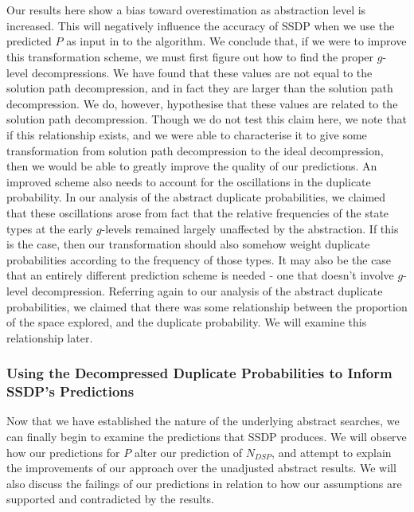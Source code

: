 \documentclass{article}
\begin{document}
Our results here show a bias toward overestimation
as abstraction level is increased.
This will negatively influence the accuracy of SSDP when we use the predicted \(\hat{P}\)
as input in to the algorithm.
We conclude that, if we were to improve this transformation scheme,
we must first figure out how to find the proper \(g\)-level decompressions.
We have found that these values are not equal to the solution path decompression,
and in fact they are larger than the solution path decompression.
We do, however, hypothesise that these values are related to the solution path decompression.
Though we do not test this claim here, we note that if this relationship exists,
and we were able to characterise it to give some transformation from solution path decompression
to the ideal decompression,
then we would be able to greatly improve the quality of our predictions.
An improved scheme also needs to account for the oscillations in the duplicate probability.
In our analysis of the abstract duplicate probabilities, we claimed that these oscillations
arose from fact that the relative frequencies of the state types at the early \(g\)-levels
remained largely unaffected by the abstraction. If this is the case,
then our transformation should also somehow weight duplicate probabilities according
to the frequency of those types.
It may also be the case that an entirely different prediction scheme is needed -
one that doesn't involve \(g\)-level decompression.
Referring again to our analysis of the abstract duplicate probabilities,
we claimed that there was some relationship between the proportion of the space
explored, and the duplicate probability.
We will examine this relationship later.

\subsubsection*{Using the Decompressed Duplicate Probabilities to Inform SSDP's Predictions}

Now that we have established the nature of the underlying abstract searches,
we can finally begin to examine the predictions that SSDP produces.
We will observe how our predictions for \(P\) alter our prediction of \(N_{DSP}\),
and attempt to explain the improvements of
our approach over the unadjusted abstract results.
We will also discuss the failings of our predictions
in relation to how our assumptions are supported and contradicted by the results. \\
\end{document}
